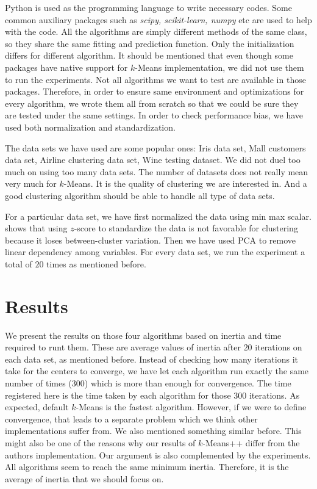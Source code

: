 \documentclass[twoside, 11pt]{article}
\begin{document}
	Python is used as the programming language to write necessary codes. Some common auxiliary packages such as \textit{scipy, scikit-learn, numpy} etc are used to help with the code. All the algorithms are simply different methods of the same class, so they share the same fitting and prediction function. Only the initialization differs for different algorithm. It should be mentioned that even though some packages have native support for $k$-Means implementation, we did not use them to run the experiments. Not all algorithms we want to test are available in those packages. Therefore, in order to ensure same environment and optimizations for every algorithm, we wrote them all from scratch so that we could be sure they are tested under the same settings. In order to check performance bias, we have used both normalization and standardization.
	
	The data sets we have used are some popular ones: Iris data set, Mall customers data set, Airline clustering data set, Wine testing dataset. We did not duel too much on using too many data sets. The number of datasets does not really mean very much for $k$-Means. It is the quality of clustering we are interested in. And a good clustering algorithm should be able to handle all type of data sets.
	
	For a particular data set, we have first normalized the data using min max scalar. \cite{miligan} shows that using $z$-score to standardize the data is not favorable for clustering because it loses between-cluster variation. Then we have used PCA to remove linear dependency among variables. For every data set, we run the experiment a total of $20$ times as mentioned before.
	\section{Results}
	We present the results on those four algorithms based on inertia and time required to runt them. These are average values of inertia after $20$ iterations on each data set, as mentioned before. Instead of checking how many iterations it take for the centers to converge, we have let each algorithm run exactly the same number of times ($300$) which is more than enough for convergence. The time registered here is the time taken by each algorithm for those $300$ iterations. As expected, default $k$-Means is the fastest algorithm. However, if we were to define convergence, that leads to a separate problem which we think other implementations suffer from. We also mentioned something similar before. This might also be one of the reasons why our results of $k$-Means++ differ from the authors implementation. Our argument is also complemented by the experiments. All algorithms seem to reach the same minimum inertia. Therefore, it is the average of inertia that we should focus on.
	
\end{document}

